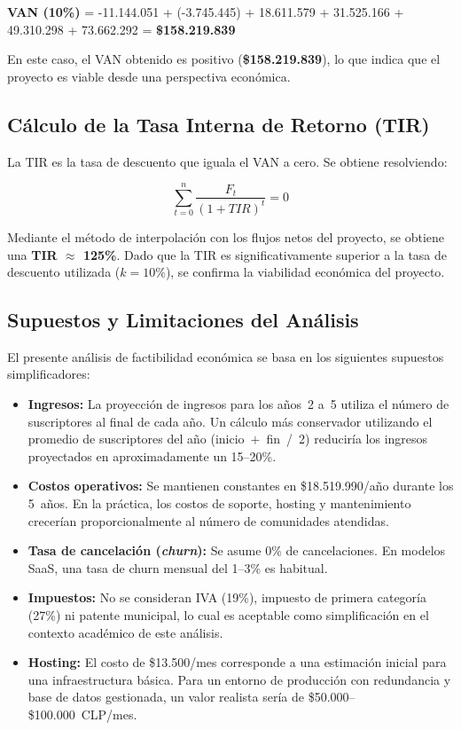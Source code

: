 \textbf{VAN (10\%)} = -11.144.051 + (-3.745.445) + 18.611.579 + 31.525.166 + 49.310.298 + 73.662.292 = \textbf{\$158.219.839}

En este caso, el VAN obtenido es positivo (\textbf{\$158.219.839}), lo que indica que el proyecto es viable desde una perspectiva económica.

\subsection{Cálculo de la Tasa Interna de Retorno (TIR)}

La TIR es la tasa de descuento que iguala el VAN a cero. Se obtiene resolviendo:

$$
\sum_{t=0}^{n} \frac{F_t}{(1 + TIR)^t} = 0
$$

Mediante el método de interpolación con los flujos netos del proyecto, se obtiene una \textbf{TIR $\approx$ 125\%}. Dado que la TIR es significativamente superior a la tasa de descuento utilizada ($k = 10\%$), se confirma la viabilidad económica del proyecto.

\subsection{Supuestos y Limitaciones del Análisis}

El presente análisis de factibilidad económica se basa en los siguientes supuestos simplificadores:

\begin{itemize}
    \item \textbf{Ingresos:} La proyección de ingresos para los años~2 a~5 utiliza el número de suscriptores al final de cada año. Un cálculo más conservador utilizando el promedio de suscriptores del año (inicio~$+$~fin~/~2) reduciría los ingresos proyectados en aproximadamente un 15--20\%.
    \item \textbf{Costos operativos:} Se mantienen constantes en \$18.519.990/año durante los 5~años. En la práctica, los costos de soporte, hosting y mantenimiento crecerían proporcionalmente al número de comunidades atendidas.
    \item \textbf{Tasa de cancelación (\textit{churn}):} Se asume 0\% de cancelaciones. En modelos SaaS, una tasa de churn mensual del 1--3\% es habitual.
    \item \textbf{Impuestos:} No se consideran IVA (19\%), impuesto de primera categoría (27\%) ni patente municipal, lo cual es aceptable como simplificación en el contexto académico de este análisis.
    \item \textbf{Hosting:} El costo de \$13.500/mes corresponde a una estimación inicial para una infraestructura básica. Para un entorno de producción con redundancia y base de datos gestionada, un valor realista sería de \$50.000--\$100.000~CLP/mes.
\end{itemize}

